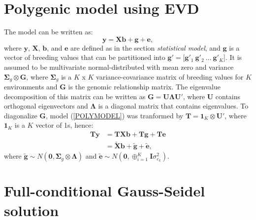 \documentclass{bmcart}
\begin{document}
\section{Polygenic model using EVD} \label{AppGblup}
The model can be written as:
\begin{equation}\label{POLYMODEL}
    \mathbf{y} = \mathbf{X}\mathbf{b} + \mathbf{g} + \mathbf{e},
\end{equation}
where $\mathbf{y}$, $\mathbf{X}$, $\mathbf{b}$, and $\mathbf{e}$ are defined as in the section \textsl{statistical model}, and $\mathbf{g}$ is a vector of breeding values that can be partitioned into $\mathbf{g}' = [\mathbf{g}'_1 ~\mathbf{g}'_2 ~\hdots ~\mathbf{g}'_K$]. It is assumed to be multivariate normal-distributed with mean zero and variance $\mathbf{\Sigma}_g\otimes\mathbf{G}$, where $\mathbf{\Sigma}_g$ is a $K$ x $K$ variance-covariance matrix of breeding values for $K$ environments and $\mathbf{G}$ is the genomic relationship matrix. The eigenvalue decomposition of this matrix can be written as $\mathbf{G} = \mathbf{U}\mathbf{\Lambda}\mathbf{U}'$, where $\mathbf{U}$ contains orthogonal eigenvectors and $\mathbf{\Lambda}$ is a diagonal matrix that contains eigenvalues. To diagonalize $\mathbf{G}$, model (\ref{POLYMODEL}) was tranformed by $\mathbf{T} = \mathbf{1}_K\otimes\mathbf{U}'$, where $\mathbf{1}_K$ is a $K$ vector of 1s, hence:
\begin{align*}
    \mathbf{T}\mathbf{y} &= \mathbf{T}\mathbf{X}\mathbf{b} + \mathbf{T}\mathbf{g} + \mathbf{T}\mathbf{e}\\
     &= \tilde{\mathbf{X}}\mathbf{b} + \tilde{\mathbf{g}} + \tilde{\mathbf{e}},
\end{align*}
where $\tilde{\mathbf{g}}\sim N(\mathbf{0}, \mathbf{\Sigma}_g\otimes\mathbf{\Lambda})$ and $\tilde{\mathbf{e}}\sim N(\mathbf{0}, \oplus^K_{i=1}\mathbf{I}\sigma^2_{e_k})$.

\section{Full-conditional Gauss-Seidel solution \label{UVMVsol}}
\end{document}
